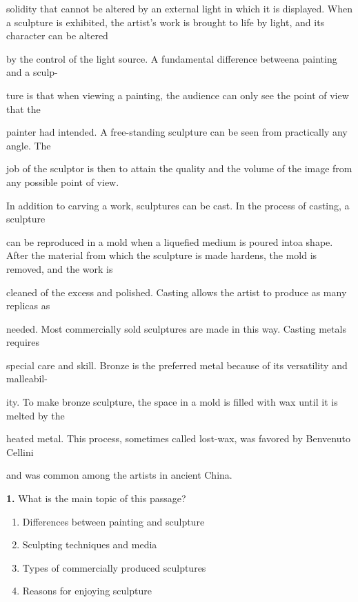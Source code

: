 \documentclass[12pt]{article}
\begin{document}
solidity that cannot be altered by an external light in which it is displayed. When a sculpture is exhibited, the artist's work is brought to life by light, and its character can be altered\par
by the control of the light source. A fundamental difference betweena painting and a sculp-\par
ture is that when viewing a painting, the audience can only see the point of view that the\par
painter had intended. A free-standing sculpture can be seen from practically any angle. The\par
job of the sculptor is then to attain the quality and the volume of the image from any possible point of view.\par
In addition to carving a work, sculptures can be cast. In the process of casting, a sculpture\par
can be reproduced in a mold when a liquefied medium is poured intoa shape. After the material from which the sculpture is made hardens, the mold is removed, and the work is\par
cleaned of the excess and polished. Casting allows the artist to produce as many replicas as\par
needed. Most commercially sold sculptures are made in this way. Casting metals requires\par
special care and skill. Bronze is the preferred metal because of its versatility and malleabil-\par
ity. To make bronze sculpture, the space in a mold is filled with wax until it is melted by the\par
heated metal. This process, sometimes called lost-wax, was favored by Benvenuto Cellini\par
and was common among the artists in ancient China.\par
\endgroup
\medskip
\noindent\textbf{1.} What is the main topic of this passage?
\begin{enumerate}[label=(\Alph*),leftmargin=*,itemsep=0.2em]
\item Differences between painting and sculpture
\item Sculpting techniques and media
\item Types of commercially produced sculptures
\item Reasons for enjoying sculpture
\end{enumerate}
\par
\vspace{0.25\baselineskip}
\end{document}
